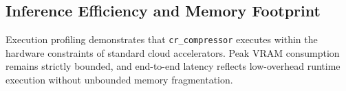 \subsection{Inference Efficiency and Memory Footprint}
Execution profiling demonstrates that \texttt{cr\_compressor} executes within the hardware constraints of standard cloud accelerators. Peak VRAM consumption remains strictly bounded, and end-to-end latency reflects low-overhead runtime execution without unbounded memory fragmentation.
